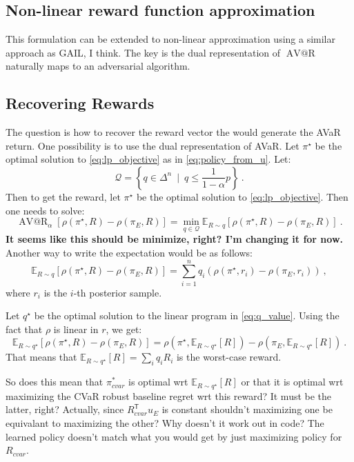 \documentclass{article}
\makeatletter
\newcommand{\tr}{^\mathsf{T}}
\DeclareMathOperator{\avar}{AV@R}
\newcommand{\Ex}{\mathbb{E}}
\newcommand{\opt}{^{\star}}
\makeatother
\begin{document}
\subsection{Non-linear reward function approximation}
	
	This formulation can be extended to non-linear approximation using a similar approach as GAIL, I think. The key is the dual representation of $\avar$ naturally maps to an adversarial algorithm. 

\subsection{Recovering Rewards}

The question is how to recover the reward vector the would generate the AVaR return. One possibility is to use the dual representation of AVaR. Let $\pi\opt$ be the optimal solution to \eqref{eq:lp_objective} as in \eqref{eq:policy_from_u}. Let:
\[ \mathcal{Q} = \left\{ q \in \Delta^n ~\mid~ q \le \frac{1}{1-\alpha} p \right\} ~. \]
Then to get the reward, let $\pi\opt$ be the optimal solution to \eqref{eq:lp_objective}. Then one needs to solve:
\begin{equation} \label{eq:q_value}
\avar_\alpha\left[ \rho(\pi\opt, R) - \rho(\pi_E, R) \right] = \min_{q\in\mathcal{Q}} \Ex_{R \sim q} \left[ \rho(\pi\opt, R) - \rho(\pi_E, R) \right]~.
\end{equation}
\textbf{It seems like this should be minimize, right? I'm changing it for now.}
Another way to write the expectation would be as follows:
\[ \Ex_{R \sim q} \left[ \rho(\pi\opt, R) - \rho(\pi_E, R) \right] = \sum_{i=1}^n q_i \left( \rho(\pi\opt, r_i) - \rho(\pi_E, r_i) \right)~, \]
where $r_i$ is the $i$-th posterior sample.


Let $q\opt$ be the optimal solution to the linear program in \eqref{eq:q_value}. Using the fact that $\rho$ is linear in $r$, we get:
\[ \Ex_{R \sim q\opt} \left[ \rho(\pi\opt, R) - \rho(\pi_E, R) \right] =  \rho\left(\pi\opt, \Ex_{R \sim q\opt}[R]\right) - \rho\left(\pi_E, \Ex_{R \sim q\opt}[R]\right)~.\]
That means that $\Ex_{R \sim q\opt}[R] = \sum_i q_i R_i$ is the worst-case reward.

So does this mean that $\pi^*_{cvar}$ is optimal wrt $\Ex_{R \sim q\opt}[R]$ or that it is optimal wrt maximizing the CVaR robust baseline regret wrt this reward? It must be the latter, right? Actually, since $R_{cvar}\tr u_E$ is constant shouldn't maximizing one be equivalant to maximizing the other? Why doesn't it work out in code? The learned policy doesn't match what you would get by just maximizing policy for $R_{cvar}$. 
\end{document}
